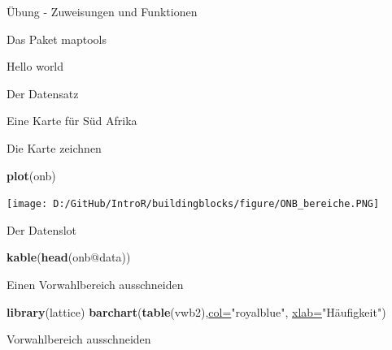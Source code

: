 \documentclass[ignorenonframetext,]{beamer}
\newenvironment{Shaded}{\begin{snugshade}}{\end{snugshade}}
\newcommand{\DataTypeTok}[1]{\textcolor[rgb]{0.74,0.68,0.62}{\underline{#1}}}
\newcommand{\DecValTok}[1]{\textcolor[rgb]{0.27,0.67,0.26}{#1}}
\newcommand{\KeywordTok}[1]{\textcolor[rgb]{0.26,0.66,0.93}{\textbf{#1}}}
\newcommand{\NormalTok}[1]{\textcolor[rgb]{0.74,0.68,0.62}{#1}}
\newcommand{\OperatorTok}[1]{\textcolor[rgb]{0.74,0.68,0.62}{#1}}
\newcommand{\StringTok}[1]{\textcolor[rgb]{0.02,0.61,0.04}{#1}}
\begin{document}
\begin{frame}[fragile]{Übung - Zuweisungen und Funktionen}
\begin{frame}[fragile]{Das Paket maptools}
\begin{frame}[fragile]{Hello world}
\begin{frame}[fragile]{Der Datensatz}
\begin{frame}[fragile]{Eine Karte für Süd Afrika}
\begin{frame}[fragile]{Die Karte zeichnen}
\begin{Shaded}
\begin{Highlighting}[]
\KeywordTok{plot}\NormalTok{(onb)}
\end{Highlighting}
\end{Shaded}

\texttt{[image: D:/GitHub/IntroR/buildingblocks/figure/ONB\_bereiche.PNG]}

\end{frame}

\begin{frame}[fragile]{Der Datenslot}
\protect\hypertarget{der-datenslot}{}

\begin{Shaded}
\begin{Highlighting}[]
\KeywordTok{kable}\NormalTok{(}\KeywordTok{head}\NormalTok{(onb}\OperatorTok{@}\NormalTok{data))}
\end{Highlighting}
\end{Shaded}

\end{frame}

\begin{frame}[fragile]{Einen Vorwahlbereich ausschneiden}
\protect\hypertarget{einen-vorwahlbereich-ausschneiden}{}

\begin{Shaded}
\end{Shaded}

\begin{Shaded}
\begin{Highlighting}[]
\KeywordTok{library}\NormalTok{(lattice)}
\KeywordTok{barchart}\NormalTok{(}\KeywordTok{table}\NormalTok{(vwb2),}\DataTypeTok{col=}\StringTok{"royalblue"}\NormalTok{,}
         \DataTypeTok{xlab=}\StringTok{"Häufigkeit"}\NormalTok{)}
\end{Highlighting}
\end{Shaded}

\end{frame}

\begin{frame}[fragile]{Vorwahlbereich ausschneiden}
\protect\hypertarget{vorwahlbereich-ausschneiden}{}


\end{frame}
\end{frame}
\end{frame}
\end{frame}
\end{frame}
\end{frame}
\end{document}
